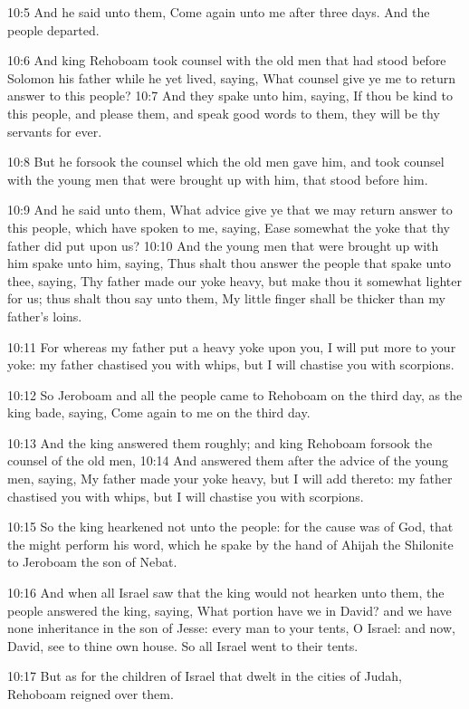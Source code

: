 10:5 And he said unto them, Come again unto me after three days. And the people departed.

10:6 And king Rehoboam took counsel with the old men that had stood before Solomon his father while he yet lived, saying, What counsel give ye me to return answer to this people?  10:7 And they spake unto him, saying, If thou be kind to this people, and please them, and speak good words to them, they will be thy servants for ever.

10:8 But he forsook the counsel which the old men gave him, and took counsel with the young men that were brought up with him, that stood before him.

10:9 And he said unto them, What advice give ye that we may return answer to this people, which have spoken to me, saying, Ease somewhat the yoke that thy father did put upon us?  10:10 And the young men that were brought up with him spake unto him, saying, Thus shalt thou answer the people that spake unto thee, saying, Thy father made our yoke heavy, but make thou it somewhat lighter for us; thus shalt thou say unto them, My little finger shall be thicker than my father's loins.

10:11 For whereas my father put a heavy yoke upon you, I will put more to your yoke: my father chastised you with whips, but I will chastise you with scorpions.

10:12 So Jeroboam and all the people came to Rehoboam on the third day, as the king bade, saying, Come again to me on the third day.

10:13 And the king answered them roughly; and king Rehoboam forsook the counsel of the old men, 10:14 And answered them after the advice of the young men, saying, My father made your yoke heavy, but I will add thereto: my father chastised you with whips, but I will chastise you with scorpions.

10:15 So the king hearkened not unto the people: for the cause was of God, that the \LORD might perform his word, which he spake by the hand of Ahijah the Shilonite to Jeroboam the son of Nebat.

10:16 And when all Israel saw that the king would not hearken unto them, the people answered the king, saying, What portion have we in David?  and we have none inheritance in the son of Jesse: every man to your tents, O Israel: and now, David, see to thine own house. So all Israel went to their tents.

10:17 But as for the children of Israel that dwelt in the cities of Judah, Rehoboam reigned over them.

